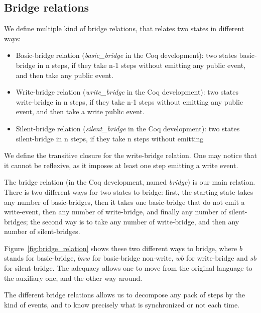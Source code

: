 \documentclass[10pt]{article}
\begin{document}

\subsection{Bridge relations}%
\label{subsec:brigde_rel}


We define multiple kind of bridge relations, that relates two states in different ways:

\begin{itemize}
  \item Basic-bridge relation (\emph{basic\_bridge} in the Coq development):
        two states basic-bridge in n steps, if they take n-1 steps without emitting any public
        event, and then take any public event.
  \item Write-bridge relation (\emph{write\_bridge} in the Coq development):
        two states write-bridge in n steps, if they take n-1 steps without emitting any public
        event, and then take a write public event.
  \item Silent-bridge relation (\emph{silent\_bridge} in the Coq development):
        two states silent-bridge in n steps, if they take n steps without emitting
\end{itemize}

We define the transitive closure for the write-bridge relation. One may notice that it cannot be
reflexive, as it imposes at least one step emitting a write event.

The bridge relation (in the Coq development, named \emph{bridge}) is our main relation. There
is two different ways for two states to bridge: first,
the starting state takes any number of basic-bridges, then it takes one basic-bridge that do not emit
a write-event, then any number of write-bridge, and finally any number of silent-bridges; the second
way is to take any number of write-bridge, and then any number of silent-bridges.

Figure~\ref{fig:bridge_relation} shows these two different ways to bridge, where $b$ stands for
basic-bridge, $bnw$ for basic-bridge non-write, $wb$ for write-bridge and $sb$ for silent-bridge.
The adequacy allows one to move from the original language to the auxiliary one, and the other way around.

The different bridge relations allows us to decompose any pack of steps by the kind of events, and
to know precisely what is synchronized or not each time.
\end{document}
